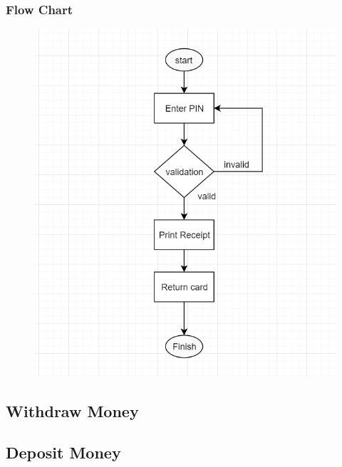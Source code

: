 \documentclass{article}
\begin{document}
		\newpage\subsubsection{Flow Chart}
		\begin{figure}[h!]
			\begin{center}
				\includegraphics[height=\linewidth]{img/inquiry_flowchart.png}
			\end{center}
		\end{figure}
	
	\newpage\subsection{Withdraw Money}
	\newpage\subsection{Deposit Money}
\end{document}
